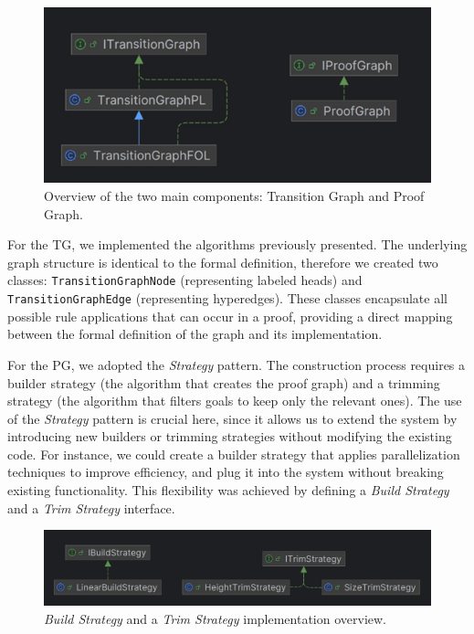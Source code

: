 \begin{figure}[h]
    \centering
    \includegraphics[width=0.5\linewidth]{Chapters/Figures/graphs.png}
    \caption{Overview of the two main components: Transition Graph and Proof Graph.}
    \label{fig:graphs-overview}
\end{figure}

For the \gls{TG}, we implemented the algorithms previously presented. The underlying graph structure is identical to the formal definition, therefore we created two classes: \texttt{TransitionGraphNode} (representing labeled heads) and \texttt{TransitionGraphEdge} (representing hyperedges). These classes encapsulate all possible rule applications that can occur in a proof, providing a direct mapping between the formal definition of the graph and its implementation.

For the \gls{PG}, we adopted the \emph{Strategy} pattern. The construction process requires a builder strategy (the algorithm that creates the proof graph) and a trimming strategy (the algorithm that filters goals to keep only the relevant ones). The use of the \emph{Strategy} pattern is crucial here, since it allows us to extend the system by introducing new builders or trimming strategies without modifying the existing code. For instance, we could create a builder strategy that applies parallelization techniques to improve efficiency, and plug it into the system without breaking existing functionality. This flexibility was achieved by defining a \emph{Build Strategy} and a \emph{Trim Strategy} interface.

\begin{figure}[h]
    \centering
    \includegraphics[width=0.8\linewidth]{Chapters/Figures/strategies.png}
    \caption{\emph{Build Strategy} and a \emph{Trim Strategy} implementation overview.}
    \label{fig:strategies}
\end{figure}

